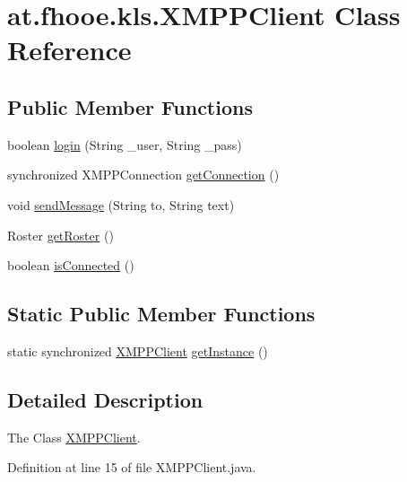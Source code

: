 \hypertarget{classat_1_1fhooe_1_1kls_1_1_x_m_p_p_client}{\section{at.\-fhooe.\-kls.\-X\-M\-P\-P\-Client Class Reference}
\label{classat_1_1fhooe_1_1kls_1_1_x_m_p_p_client}
}
\subsection*{Public Member Functions}
\begin{DoxyCompactItemize}
\item 
boolean \hyperlink{classat_1_1fhooe_1_1kls_1_1_x_m_p_p_client_a7085e8e7e902ef91891b24aab02e32f2}{login} (String \-\_\-user, String \-\_\-pass)
\item 
synchronized X\-M\-P\-P\-Connection \hyperlink{classat_1_1fhooe_1_1kls_1_1_x_m_p_p_client_a50000e91b8134125b4a58d0ba6780174}{get\-Connection} ()
\item 
void \hyperlink{classat_1_1fhooe_1_1kls_1_1_x_m_p_p_client_a7d97b5f01883310b54ac1301b4c8e2b0}{send\-Message} (String to, String text)
\item 
Roster \hyperlink{classat_1_1fhooe_1_1kls_1_1_x_m_p_p_client_a6e052554033d0afbf30fee96ad4dff3e}{get\-Roster} ()
\item 
boolean \hyperlink{classat_1_1fhooe_1_1kls_1_1_x_m_p_p_client_a687d8c97f8f06d01787e9c189be9efcf}{is\-Connected} ()
\end{DoxyCompactItemize}
\subsection*{Static Public Member Functions}
\begin{DoxyCompactItemize}
\item 
static synchronized \hyperlink{classat_1_1fhooe_1_1kls_1_1_x_m_p_p_client}{X\-M\-P\-P\-Client} \hyperlink{classat_1_1fhooe_1_1kls_1_1_x_m_p_p_client_a55fd345e9f473515e5fd916c9ae58c2e}{get\-Instance} ()
\end{DoxyCompactItemize}


\subsection{Detailed Description}
The Class \hyperlink{classat_1_1fhooe_1_1kls_1_1_x_m_p_p_client}{X\-M\-P\-P\-Client}. 

Definition at line 15 of file X\-M\-P\-P\-Client.\-java.



